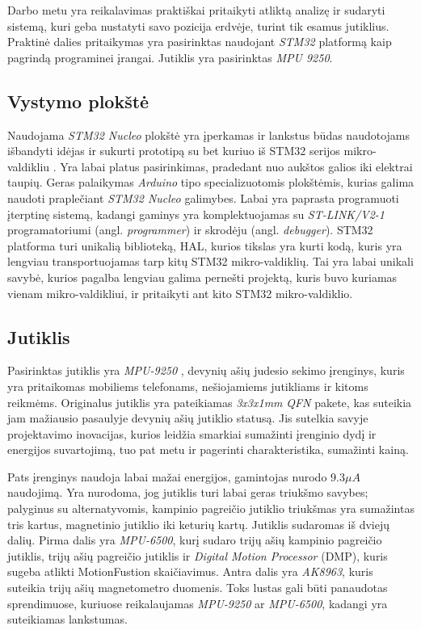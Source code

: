 Darbo metu yra reikalavimas praktiškai pritaikyti atliktą analizę ir sudaryti sistemą, kuri geba nustatyti savo pozicija erdvėje, turint tik esamus jutiklius.
Praktinė dalies pritaikymas yra pasirinktas naudojant \textit{STM32} platformą kaip pagrindą programinei įrangai.
Jutiklis yra pasirinktas \textit{MPU 9250}.

\subsection{Vystymo plokštė}

Naudojama \textit{STM32 Nucleo} plokštė yra įperkamas ir lankstus būdas naudotojams išbandyti idėjas ir sukurti prototipą su bet kuriuo iš STM32 serijos mikro-valdikliu \cite{STM3258:online}.
Yra labai platus pasirinkimas, pradedant nuo aukštos galios iki elektrai taupių.
Geras palaikymas \textit{Arduino} tipo specializuotomis plokštėmis, kurias galima naudoti praplečiant \textit{STM32 Nucleo} galimybes.
Labai yra paprasta programuoti įterptinę sistemą, kadangi gaminys yra komplektuojamas su \textit{ST-LINK/V2-1} programatoriumi (angl. \textit{programmer}) ir skrodėju (angl. \textit{debugger}).
STM32 platforma turi unikalią biblioteką, HAL, kurios tikslas yra kurti kodą, kuris yra lengviau transportuojamas tarp kitų STM32 mikro-valdiklių.
Tai yra labai unikali savybė, kurios pagalba lengviau galima pernešti projektą, kuris buvo kuriamas vienam mikro-valdikliui, ir pritaikyti ant kito STM32 mikro-valdiklio.

\subsection{Jutiklis}

Pasirinktas jutiklis yra \textit{MPU-9250} \cite{MPU-96:online}, devynių ašių judesio sekimo įrenginys, kuris yra pritaikomas mobiliems telefonams, nešiojamiems jutikliams ir kitoms reikmėms.
Originalus  jutiklis yra pateikiamas \textit{3x3x1mm} \textit{QFN} pakete, kas suteikia jam mažiausio pasaulyje devynių ašių jutiklio statusą.
Jis sutelkia savyje projektavimo inovacijas, kurios leidžia smarkiai sumažinti įrenginio dydį ir energijos suvartojimą, tuo pat metu ir pagerinti charakteristika, sumažinti kainą.

Pats įrenginys naudoja labai mažai energijos, gamintojas nurodo $9.3\mu A$ naudojimą.
Yra nurodoma, jog jutiklis turi labai geras triukšmo savybes; palyginus su alternatyvomis, kampinio pagreičio jutiklio triukšmas yra sumažintas tris kartus, magnetinio jutiklio iki keturių kartų.
Jutiklis sudaromas iš dviejų dalių.
Pirma dalis yra \textit{MPU-6500}, kurį sudaro trijų ašių kampinio pagreičio jutiklis, trijų ašių pagreičio jutiklis ir \textit{Digital Motion Processor} (DMP), kuris sugeba atlikti MotionFustion skaičiavimus.
Antra dalis yra \textit{AK8963}, kuris suteikia trijų ašių magnetometro duomenis.
Toks lustas gali būti panaudotas sprendimuose, kuriuose reikalaujamas \textit{MPU-9250} ar \textit{MPU-6500}, kadangi yra suteikiamas lankstumas.

